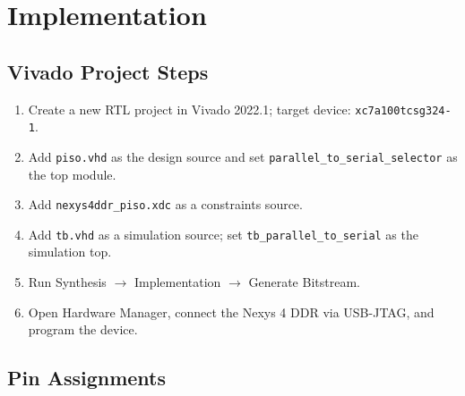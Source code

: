 \documentclass[12pt,a4paper]{report}
\begin{document}
\chapter{Implementation}

\section{Vivado Project Steps}

\begin{enumerate}[leftmargin=1.5em]
  \item Create a new RTL project in Vivado 2022.1; target device: \texttt{xc7a100tcsg324-1}.
  \item Add \texttt{piso.vhd} as the design source and set \texttt{parallel\_to\_serial\_selector} as the top module.
  \item Add \texttt{nexys4ddr\_piso.xdc} as a constraints source.
  \item Add \texttt{tb.vhd} as a simulation source; set \texttt{tb\_parallel\_to\_serial} as the simulation top.
  \item Run Synthesis $\to$ Implementation $\to$ Generate Bitstream.
  \item Open Hardware Manager, connect the Nexys 4 DDR via USB-JTAG, and program the device.
\end{enumerate}

\section{Pin Assignments}
\end{document}
